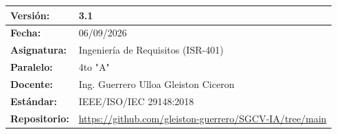 \documentclass[
]{article}
\newcounter{none} %
\begin{document}
{\def\LTcaptype{none} %
\begin{longtable}[]{|
  >{\raggedright\arraybackslash}p{}|
  >{\raggedright\arraybackslash}p{}|}
\hline
\begin{minipage}[b]{\linewidth}\raggedright
\textbf{Versión:}
\end{minipage} & \begin{minipage}[b]{\linewidth}\raggedright
3.1
\end{minipage} \\
\hline
\endhead
\hline
\endlastfoot
\begin{minipage}[t]{\linewidth}\raggedright
\textbf{Fecha:}
\end{minipage} & \begin{minipage}[t]{\linewidth}\raggedright
06/09/2026
\end{minipage} \\
\hline
\begin{minipage}[t]{\linewidth}\raggedright
\textbf{Asignatura:}
\end{minipage} & \begin{minipage}[t]{\linewidth}\raggedright
Ingeniería de Requisitos (ISR-401)
\end{minipage} \\
\hline
\begin{minipage}[t]{\linewidth}\raggedright
\textbf{Paralelo:}
\end{minipage} & \begin{minipage}[t]{\linewidth}\raggedright
4to "A"
\end{minipage} \\
\hline
\begin{minipage}[t]{\linewidth}\raggedright
\textbf{Docente:}
\end{minipage} & \begin{minipage}[t]{\linewidth}\raggedright
Ing. Guerrero Ulloa Gleiston Ciceron
\end{minipage} \\
\hline
\begin{minipage}[t]{\linewidth}\raggedright
\textbf{Estándar:}
\end{minipage} & \begin{minipage}[t]{\linewidth}\raggedright
IEEE/ISO/IEC 29148:2018~\cite{iso29148}
\end{minipage} \\
\hline
\begin{minipage}[t]{\linewidth}\raggedright
\textbf{Repositorio:}
\end{minipage} & \begin{minipage}[t]{\linewidth}\raggedright
\url{https://github.com/gleiston-guerrero/SGCV-IA/tree/main}
\end{minipage} \\
\hline
\end{longtable}
}
\end{document}
